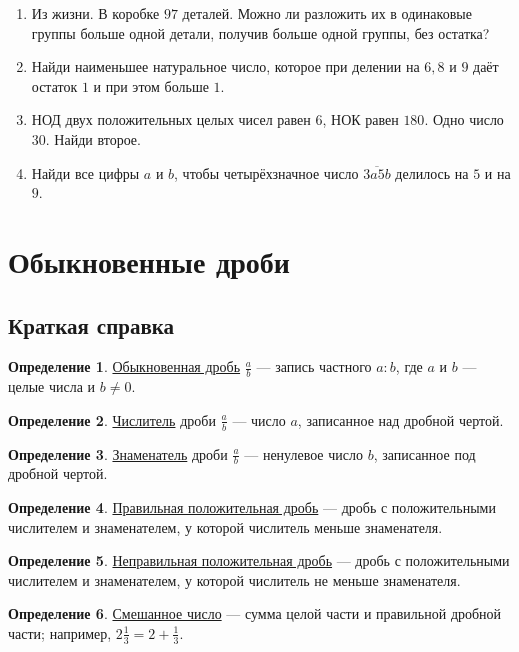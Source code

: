\documentclass[12pt,a4paper]{article}
\theoremstyle{definition}
\newtheorem{definition}{Определение}[section]
\theoremstyle{plain}
\theoremstyle{remark}
\newcommand{\term}[1]{\uline{#1}}
\newcommand{\starmark}{\ensuremath{{}^{\ast}}}
\begin{document}
\begin{enumerate}[label=\thesection.\arabic*.,leftmargin=2.8em,itemsep=12pt]
\item Из жизни. В коробке \(97\) деталей. Можно ли разложить их в одинаковые группы больше одной детали, получив больше одной группы, без остатка?
\item[\textbf{2.35.}\starmark] Найди наименьшее натуральное число, которое при делении на \(6,\allowbreak 8\) и \(9\) даёт остаток \(1\) и при этом больше \(1\).
\item[\textbf{2.36.}\starmark] НОД двух положительных целых чисел равен \(6\), НОК равен \(180\). Одно число \(30\). Найди второе.
\item[\textbf{2.37.}\starmark] Найди все цифры \(a\) и \(b\), чтобы четырёхзначное число \(\overline{3a5b}\) делилось на \(5\) и на \(9\).
\end{enumerate}
\clearpage
\section{Обыкновенные дроби}
\subsection*{Краткая справка}
\begin{definition}\term{Обыкновенная дробь} \(\frac{a}{b}\) — запись частного \(a : b\), где \(a\) и \(b\) — целые числа и \(b \ne  0\).\end{definition}
\begin{definition}\term{Числитель} дроби \(\frac{a}{b}\) — число \(a\), записанное над дробной чертой.\end{definition}
\begin{definition}\term{Знаменатель} дроби \(\frac{a}{b}\) — ненулевое число \(b\), записанное под дробной чертой.\end{definition}
\begin{definition}\term{Правильная положительная дробь} — дробь с положительными числителем и знаменателем, у которой числитель меньше знаменателя.\end{definition}
\begin{definition}\term{Неправильная положительная дробь} — дробь с положительными числителем и знаменателем, у которой числитель не меньше знаменателя.\end{definition}
\begin{definition}\term{Смешанное число} — сумма целой части и правильной дробной части; например, \(2 \frac{1}{3} = 2 + \frac{1}{3}\).\end{definition}
\end{document}
